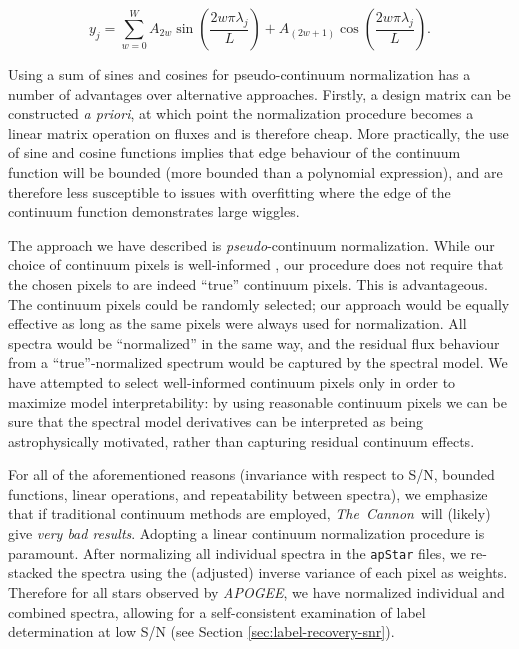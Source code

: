 \documentclass[12pt,preprint]{aastex}
\newcommand{\project}[1]{\textsl{#1}}
\newcommand{\TheCannon}{\project{The~Cannon}}
\newcommand{\acronym}[1]{{\small{#1}}}
\newcommand{\apogee}{\project{\acronym{APOGEE}}}
\begin{document}
\begin{equation}
y_j = \sum_{w=0}^{W} A_{2w}\sin{\left(\frac{2w\pi\lambda_{j}}{L}\right)} + A_{(2w+1)}\cos{\left(\frac{2w\pi\lambda_{j}}{L}\right)}.
\end{equation}

Using a sum of sines and cosines for pseudo-continuum normalization has a number
of advantages over alternative approaches.  Firstly, a design matrix can be
constructed \emph{a priori}, at which point the normalization procedure becomes a
linear matrix operation on fluxes and is therefore cheap.  More practically, 
the use of sine and cosine functions implies that edge behaviour of the 
continuum function will be bounded (more bounded than a polynomial expression),
and are therefore less susceptible to issues with overfitting where the edge of
the continuum function demonstrates large wiggles.


The approach we have described is \emph{pseudo}-continuum normalization.  While 
our choice of continuum pixels is well-informed \citep{tc}, our 
procedure does not require that the chosen pixels to are indeed ``true'' continuum
pixels.  This is advantageous.  The continuum pixels could be randomly selected; 
our approach would be equally effective as long as the same pixels were always
used for normalization.  All spectra would be ``normalized'' in the same way, and
the residual flux behaviour from a ``true''-normalized spectrum would be captured 
by the spectral model.  We have attempted to select well-informed continuum
pixels only in order to maximize model interpretability: by using reasonable 
continuum pixels we can be sure that the spectral model derivatives can be 
interpreted as being astrophysically motivated, rather than capturing residual 
continuum effects.


For all of the aforementioned reasons (invariance with respect to S/N, bounded
functions, linear operations, and repeatability between spectra), we emphasize
that if traditional continuum methods are employed, \TheCannon\ will (likely) 
give \emph{very bad results}.  Adopting a linear continuum normalization 
procedure is paramount.  After normalizing all individual spectra in the
\texttt{apStar} files, we re-stacked the spectra using the (adjusted) inverse
variance of each pixel as weights.  Therefore for all stars observed by \apogee,
we have normalized individual and combined spectra, allowing for a 
self-consistent examination of label determination at low S/N (see Section
\ref{sec:label-recovery-snr}).
\end{document}
